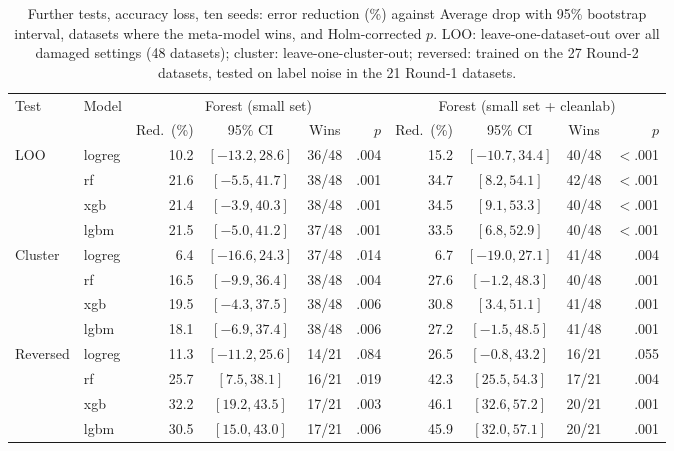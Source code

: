 \documentclass[conference]{IEEEtran}
\begin{document}
\begin{table}[!t]
\centering
\caption{Further tests, accuracy loss, ten seeds: error reduction (\%) against Average drop with 95\% bootstrap interval, datasets where the meta-model wins, and Holm-corrected $p$. LOO: leave-one-dataset-out over all damaged settings (48 datasets); cluster: leave-one-cluster-out; reversed: trained on the 27 Round-2 datasets, tested on label noise in the 21 Round-1 datasets.}
\label{tab:evid}
\footnotesize
\setlength{\tabcolsep}{3pt}
\begin{tabular}{@{}llrccrrccr@{}}
\toprule
Test & Model & \multicolumn{4}{c}{Forest (small set)} & \multicolumn{4}{c}{Forest (small set + cleanlab)} \\
\cmidrule(lr){3-6}\cmidrule(l){7-10}
 & & Red.\ (\%) & 95\% CI & Wins & $p$ & Red.\ (\%) & 95\% CI & Wins & $p$ \\
\midrule
LOO & logreg & 10.2 & $[-13.2, 28.6]$ & 36/48 & .004 & 15.2 & $[-10.7, 34.4]$ & 40/48 & $<$.001 \\
 & rf & 21.6 & $[-5.5, 41.7]$ & 38/48 & .001 & 34.7 & $[8.2, 54.1]$ & 42/48 & $<$.001 \\
 & xgb & 21.4 & $[-3.9, 40.3]$ & 38/48 & .001 & 34.5 & $[9.1, 53.3]$ & 40/48 & $<$.001 \\
 & lgbm & 21.5 & $[-5.0, 41.2]$ & 37/48 & .001 & 33.5 & $[6.8, 52.9]$ & 40/48 & $<$.001 \\
\midrule
Cluster & logreg & 6.4 & $[-16.6, 24.3]$ & 37/48 & .014 & 6.7 & $[-19.0, 27.1]$ & 41/48 & .004 \\
 & rf & 16.5 & $[-9.9, 36.4]$ & 38/48 & .004 & 27.6 & $[-1.2, 48.3]$ & 40/48 & .001 \\
 & xgb & 19.5 & $[-4.3, 37.5]$ & 38/48 & .006 & 30.8 & $[3.4, 51.1]$ & 41/48 & .001 \\
 & lgbm & 18.1 & $[-6.9, 37.4]$ & 38/48 & .006 & 27.2 & $[-1.5, 48.5]$ & 41/48 & .001 \\
\midrule
Reversed & logreg & 11.3 & $[-11.2, 25.6]$ & 14/21 & .084 & 26.5 & $[-0.8, 43.2]$ & 16/21 & .055 \\
 & rf & 25.7 & $[7.5, 38.1]$ & 16/21 & .019 & 42.3 & $[25.5, 54.3]$ & 17/21 & .004 \\
 & xgb & 32.2 & $[19.2, 43.5]$ & 17/21 & .003 & 46.1 & $[32.6, 57.2]$ & 20/21 & .001 \\
 & lgbm & 30.5 & $[15.0, 43.0]$ & 17/21 & .006 & 45.9 & $[32.0, 57.1]$ & 20/21 & .001 \\
\bottomrule
\end{tabular}
\end{table}
\end{document}
